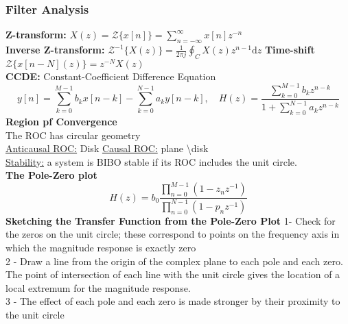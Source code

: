 \documentclass{article}
\begin{document}
\begin{multicols}{2}
\subsubsection{Filter Analysis}
\textbf{Z-transform:} $X(z)= \mathscr{Z}\{x[n]\} = \sum_{n=-\infty}^\infty x[n]z^{-n}$  \\
\textbf{Inverse Z-transform:} $\mathscr{Z}^{-1} \{X(z)\} = \frac 1{2\pi j} \oint_C X(z) z^{n-1}\mathrm{d}z$
\textbf{Time-shift} $\mathscr{Z}\{x[n-N](z)\} = z^{-N}X(z)$\\
\textbf{CCDE:} Constant-Coefficient Difference Equation 
$$y[n] = \sum_{k=0}^{M-1}b_kx[n-k] - \sum_{k=0}^{N-1}a_ky[n-k], \quad H(z) = \frac{\sum_{k=0}^{M-1}b_kz^{n-k}}{1 +  \sum_{k=0}^{N-1}a_kz^{n-k}}  $$
\textbf{Region pf Convergence}\\
The ROC has circular geometry\\
\underline {Anticausal ROC:} Disk \indent \underline{Causal ROC:} plane \textbackslash disk \\
\underline{Stability:} a system is BIBO stable if its ROC includes the unit circle.\\ 
\textbf{The Pole-Zero plot} $$H(z) = b_0\frac{\prod_{n=0}^{M-1}(1-z_nz^{-1})}{\prod_{n=0}^{N-1}(1-p_nz^{-1})} $$
\textbf{Sketching the Transfer Function from the Pole-Zero Plot}
1- Check for the zeros on the unit circle; these  correspond to points on the frequency axis in which the magnitude response is exactly zero\\
2 - Draw a line from the origin of the complex plane to each pole and each zero. The point of intersection of each line with the unit circle gives the location of a local extremum for the magnitude response. \\
3 - The effect of each pole and each zero is made stronger by their proximity to the unit circle
\end{multicols}
\end{document}
